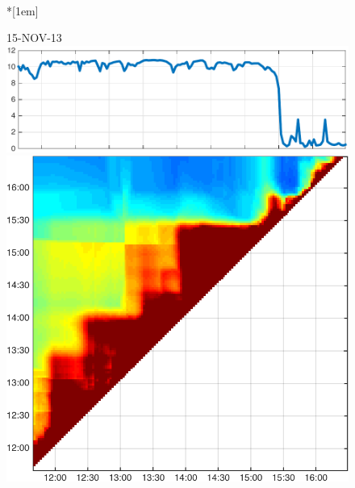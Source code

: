 \begin{figure}
\begin{minipage}[c]{\mylength}
\end{minipage}  \\*[1em]
\begin{minipage}[c]{\mylength}
\centering \scriptsize 15-NOV-13 \\
\includegraphics[valign=t,trim=0 0 5pt 0,angle=90,origin=tr,width=\sunintwidth,totalheight=\eventheight]{events/20131115-intensity.pdf}
\includegraphics[valign=t,width=\eventswidth]{events/20131115-maxGain-local-events.png}

\end{minipage}
\end{figure}
